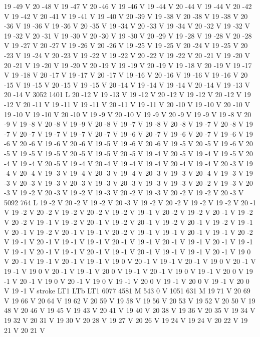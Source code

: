 {{19 -49 V
20 -48 V
19 -47 V
20 -46 V
19 -46 V
19 -44 V
20 -44 V
19 -44 V
20 -42 V
19 -42 V
20 -41 V
19 -41 V
19 -40 V
20 -39 V
19 -38 V
20 -38 V
19 -38 V
20 -36 V
19 -36 V
19 -36 V
20 -35 V
19 -34 V
20 -33 V
19 -34 V
20 -32 V
19 -32 V
19 -32 V
20 -31 V
19 -30 V
20 -30 V
19 -30 V
20 -29 V
19 -28 V
19 -28 V
20 -28 V
19 -27 V
20 -27 V
19 -26 V
20 -26 V
19 -25 V
19 -25 V
20 -24 V
19 -25 V
20 -23 V
19 -24 V
20 -23 V
19 -22 V
19 -22 V
20 -22 V
19 -22 V
20 -21 V
19 -20 V
20 -21 V
19 -20 V
19 -20 V
20 -19 V
19 -19 V
20 -19 V
19 -18 V
20 -19 V
19 -17 V
19 -18 V
20 -17 V
19 -17 V
20 -17 V
19 -16 V
20 -16 V
19 -16 V
19 -16 V
20 -15 V
19 -15 V
20 -15 V
19 -15 V
20 -14 V
19 -14 V
19 -14 V
20 -14 V
19 -13 V
20 -14 V
3052 1401 L
20 -12 V
19 -13 V
19 -12 V
20 -12 V
19 -12 V
20 -12 V
19 -12 V
20 -11 V
19 -11 V
19 -11 V
20 -11 V
19 -11 V
20 -10 V
19 -10 V
20 -10 V
19 -10 V
19 -10 V
20 -10 V
19 -9 V
20 -10 V
19 -9 V
20 -9 V
19 -9 V
19 -8 V
20 -9 V
19 -8 V
20 -8 V
19 -9 V
20 -8 V
19 -7 V
19 -8 V
20 -8 V
19 -7 V
20 -8 V
19 -7 V
20 -7 V
19 -7 V
19 -7 V
20 -7 V
19 -6 V
20 -7 V
19 -6 V
20 -7 V
19 -6 V
19 -6 V
20 -6 V
19 -6 V
20 -6 V
19 -5 V
19 -6 V
20 -6 V
19 -5 V
20 -5 V
19 -6 V
20 -5 V
19 -5 V
19 -5 V
20 -5 V
19 -5 V
20 -5 V
19 -4 V
20 -5 V
19 -4 V
19 -5 V
20 -4 V
19 -4 V
20 -5 V
19 -4 V
20 -4 V
19 -4 V
19 -4 V
20 -4 V
19 -4 V
20 -3 V
19 -4 V
20 -4 V
19 -3 V
19 -4 V
20 -3 V
19 -4 V
20 -3 V
19 -3 V
20 -4 V
19 -3 V
19 -3 V
20 -3 V
19 -3 V
20 -3 V
19 -3 V
20 -3 V
19 -3 V
19 -3 V
20 -2 V
19 -3 V
20 -3 V
19 -2 V
20 -3 V
19 -2 V
19 -3 V
20 -2 V
19 -3 V
20 -2 V
19 -2 V
20 -3 V
5092 764 L
19 -2 V
20 -2 V
19 -2 V
20 -3 V
19 -2 V
20 -2 V
19 -2 V
19 -2 V
20 -1 V
19 -2 V
20 -2 V
19 -2 V
20 -2 V
19 -2 V
19 -1 V
20 -2 V
19 -2 V
20 -1 V
19 -2 V
20 -2 V
19 -1 V
19 -2 V
20 -1 V
19 -2 V
20 -1 V
19 -2 V
20 -1 V
19 -2 V
19 -1 V
20 -1 V
19 -2 V
20 -1 V
19 -1 V
20 -2 V
19 -1 V
19 -1 V
20 -1 V
19 -1 V
20 -2 V
19 -1 V
20 -1 V
19 -1 V
19 -1 V
20 -1 V
19 -1 V
20 -1 V
19 -1 V
20 -1 V
19 -1 V
19 -1 V
20 -1 V
19 -1 V
20 -1 V
19 -1 V
20 -1 V
19 -1 V
19 -1 V
20 -1 V
19 0 V
20 -1 V
19 -1 V
20 -1 V
19 -1 V
19 0 V
20 -1 V
19 -1 V
20 -1 V
19 0 V
20 -1 V
19 -1 V
19 0 V
20 -1 V
19 -1 V
20 0 V
19 -1 V
20 -1 V
19 0 V
19 -1 V
20 0 V
19 -1 V
20 -1 V
19 0 V
20 -1 V
19 0 V
19 -1 V
20 0 V
19 -1 V
20 0 V
19 -1 V
20 0 V
19 -1 V
stroke
LT1
LTb
LT1
6077 4581 M
543 0 V
1051 631 M
19 71 V
20 69 V
19 66 V
20 64 V
19 62 V
20 59 V
19 58 V
19 56 V
20 53 V
19 52 V
20 50 V
19 48 V
20 46 V
19 45 V
19 43 V
20 41 V
19 40 V
20 38 V
19 36 V
20 35 V
19 34 V
19 32 V
20 31 V
19 30 V
20 28 V
19 27 V
20 26 V
19 24 V
19 24 V
20 22 V
19 21 V
20 21 V
}}
